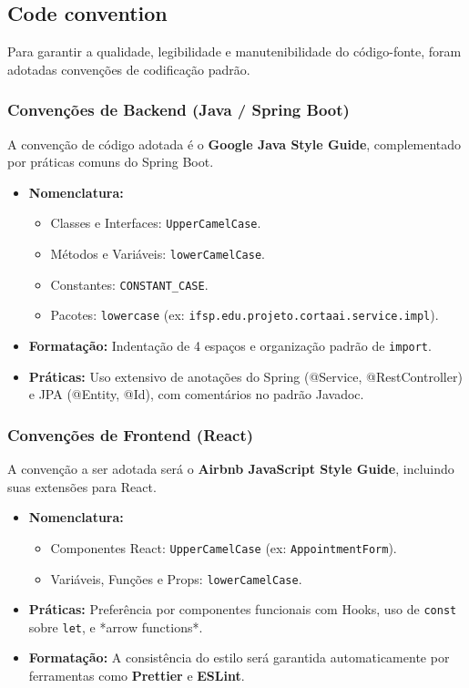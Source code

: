 \documentclass[
    12pt, 
    a4paper, 
    oneside, 
    chapter=TITLE, 
    section=TITLE
]{abntex2}
\begin{document}
\subsection{Code convention}
Para garantir a qualidade, legibilidade e manutenibilidade do código-fonte, foram adotadas convenções de codificação padrão.

\subsubsection{Convenções de Backend (Java / Spring Boot)}
A convenção de código adotada é o \textbf{Google Java Style Guide}, complementado por práticas comuns do Spring Boot.
\begin{itemize}
    \item \textbf{Nomenclatura:}
        \begin{itemize}
            \item Classes e Interfaces: \texttt{UpperCamelCase}.
            \item Métodos e Variáveis: \texttt{lowerCamelCase}.
            \item Constantes: \texttt{CONSTANT\_CASE}.
            \item Pacotes: \texttt{lowercase} (ex: \texttt{ifsp.edu.projeto.cortaai.service.impl}).
        \end{itemize}
    \item \textbf{Formatação:} Indentação de 4 espaços e organização padrão de \texttt{import}.
    \item \textbf{Práticas:} Uso extensivo de anotações do Spring (@Service, @RestController) e JPA (@Entity, @Id), com comentários no padrão Javadoc.
\end{itemize}

\subsubsection{Convenções de Frontend (React)}
A convenção a ser adotada será o \textbf{Airbnb JavaScript Style Guide}, incluindo suas extensões para React.
\begin{itemize}
    \item \textbf{Nomenclatura:}
        \begin{itemize}
            \item Componentes React: \texttt{UpperCamelCase} (ex: \texttt{AppointmentForm}).
            \item Variáveis, Funções e Props: \texttt{lowerCamelCase}.
        \end{itemize}
    \item \textbf{Práticas:} Preferência por componentes funcionais com Hooks, uso de \texttt{const} sobre \texttt{let}, e *arrow functions*.
    \item \textbf{Formatação:} A consistência do estilo será garantida automaticamente por ferramentas como \textbf{Prettier} e \textbf{ESLint}.
\end{itemize}
\end{document}
